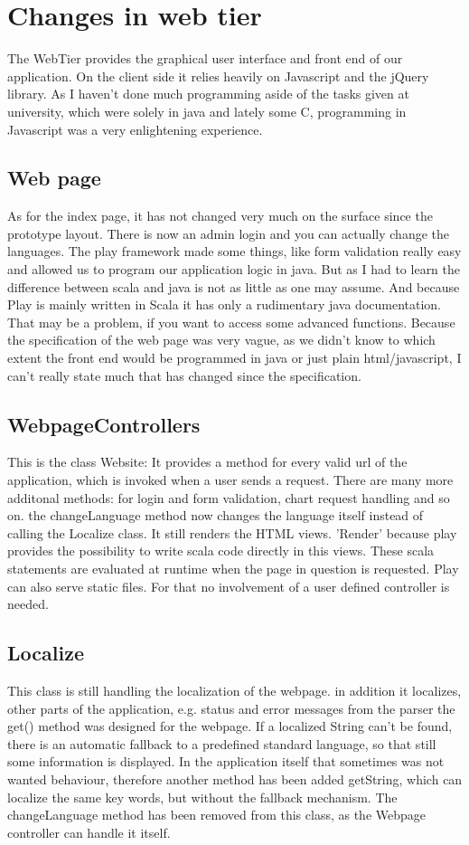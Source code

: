 \section{Changes in web tier}

The WebTier provides the graphical user interface and front end of our application.
On the client side it relies heavily on Javascript and the jQuery library.
As I haven't done much programming aside of the tasks given at university, which were solely in java and lately some C,
programming in Javascript was a very enlightening experience.

\subsection{Web page}
As for the index page, it has not changed very much on the surface since the prototype layout.
There is now an admin login and you can actually change the languages.
The play framework made some things, like form validation really easy and allowed us to program our application logic in java.
But as I had to learn the difference between scala and java is not as little as one may assume.
And because Play is mainly written in Scala it has only a rudimentary java documentation. That may be a problem, if you want
to access some advanced functions.
Because the specification of the web page was very vague, as we didn't know to which extent the front end would be
programmed in java or just plain html/javascript, I can't really state much that has changed since the specification.

\subsection{WebpageControllers}
This is the class Website: It provides a method for every valid url of the application, which is invoked when a user sends
a request.
There are many more additonal methods:
for login and form validation, chart request handling and so on.
the changeLanguage method now changes the language itself instead of calling the Localize class.
It still renders the HTML views. 'Render' because play provides the possibility to write scala code directly in this views.
These scala statements are evaluated at runtime when the page in question is requested.
Play can also serve static files. For that no involvement of a user defined controller is needed.

\subsection{Localize}
This class is still handling the localization of the webpage. in addition it localizes, other parts of the application,
e.g. status and error messages from the parser
the get() method was designed for the webpage. If a localized String can't be found, there is an automatic fallback to a
predefined standard language, so that still some information is displayed.
In the application itself that sometimes was not wanted behaviour, therefore another method has been added
getString, which can localize the same key words, but without the fallback mechanism.
The changeLanguage method has been removed from this class, as the Webpage controller can handle it itself.


